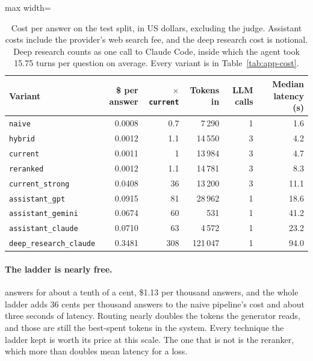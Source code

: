 \begin{table}[htbp]
    \centering
    \footnotesize
    \begin{adjustbox}{max width=\textwidth}
    \begin{tabular}{|l|r|r|r|r|r|}
        \hline
        \textbf{Variant} & \textbf{\$ per answer} & \textbf{$\times$ \texttt{current}} & \textbf{Tokens in} & \textbf{LLM calls} & \textbf{Median latency (s)} \\
        \hline
        \texttt{naive} & 0.0008 & 0.7 & 7\,290 & 1 & 1.6 \\
        \texttt{hybrid} & 0.0012 & 1.1 & 14\,550 & 3 & 4.2 \\
        \texttt{current} & 0.0011 & 1 & 13\,984 & 3 & 4.7 \\
        \texttt{reranked} & 0.0012 & 1.1 & 14\,781 & 3 & 8.3 \\
        \hline
        \texttt{current\_strong} & 0.0408 & 36 & 13\,200 & 3 & 11.1 \\
        \texttt{assistant\_gpt} & 0.0915 & 81 & 28\,962 & 1 & 18.6 \\
        \texttt{assistant\_gemini} & 0.0674 & 60 & 531 & 1 & 41.2 \\
        \texttt{assistant\_claude} & 0.0710 & 63 & 4\,572 & 1 & 23.2 \\
        \texttt{deep\_research\_claude} & 0.3481 & 308 & 121\,047 & 1 & 94.0 \\
        \hline
    \end{tabular}
    \end{adjustbox}
    \caption[Cost per answer]{Cost per answer on the test split, in US dollars,
    excluding the judge. Assistant costs include the provider's web search fee,
    and the deep research cost is notional. Deep research counts as one call to
    Claude Code, inside which the agent took 15.75 turns per question on
    average. Every variant is in Table~\ref{tab:app-cost}.}
    \label{tab:results-cost}
\end{table}

\paragraph{The ladder is nearly free.} \sysname{} answers for about a tenth
of a cent, \$1.13 per thousand answers, and the whole ladder adds 36 cents per
thousand answers to the naive pipeline's cost and about three seconds of
latency. Routing nearly doubles the tokens the generator reads, and those are still
the best-spent tokens in the system.
Every technique the ladder kept is worth its price at this scale. The one
that is not is the reranker, which more than doubles mean latency for a loss.

